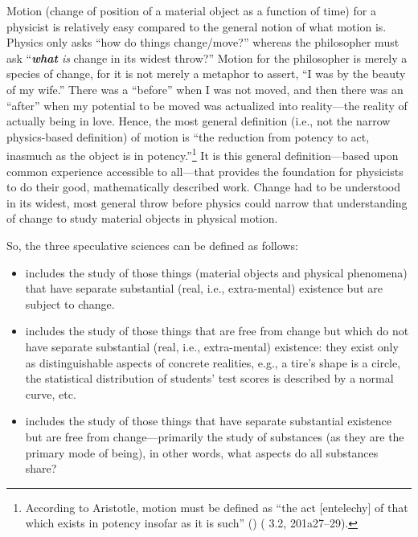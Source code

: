 \label{page:motion}Motion (change of position of a material object as a function of time) for a physicist is relatively easy compared to the general notion of what motion is. Physics only asks ``how do things change/move?'' whereas the philosopher must ask ``\textit{\textbf{what} is} change in its widest throw?'' Motion for the philosopher is merely a species of change, for it is not merely a metaphor to assert, ``I was  by the beauty of my wife.'' There was a ``before'' when I was not moved, and then there was an ``after'' when my potential to be moved was actualized into reality---the reality of actually being in love. Hence, the most general definition (i.e., not the narrow physics-based definition) of motion is ``the reduction from potency to act, inasmuch as the object is in potency.''\footnote{According to Aristotle, motion must be defined as ``the act [entelechy] of that which exists in potency insofar as it is such'' () ( 3.2, 201a27--29).} It is this general definition---based upon common experience accessible to all---that provides the foundation for physicists to do their good, mathematically described work. Change had to be understood in its widest, most general throw before physics could narrow that understanding of change to study material objects in physical motion.

So, the three speculative sciences can be defined as follows:

\begin{itemize}
\item {} includes the study of those things (material objects and physical phenomena) that have separate substantial (real, i.e., extra-mental) existence but are subject to change.
\item {} includes the study of those things that are free from change but which do not have separate substantial (real, i.e., extra-mental) existence: they exist only as distinguishable aspects of concrete realities, e.g., a tire's shape is a circle, the statistical distribution of students' test scores is described by a normal curve, etc.
\item {} includes the study of those things that have separate substantial existence but are free from change---primarily the study of substances (as they are the primary mode of being), in other words, what aspects do all substances share?
\end{itemize}

